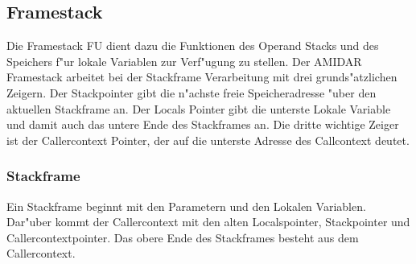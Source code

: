 \subsection{Framestack}

Die Framestack FU dient dazu die Funktionen des Operand Stacks und des Speichers f"ur lokale Variablen zur Verf"ugung zu stellen. 
Der AMIDAR Framestack arbeitet bei der Stackframe Verarbeitung mit drei grunds"atzlichen Zeigern. Der Stackpointer gibt die n"achste freie Speicheradresse "uber den aktuellen Stackframe an. Der Locals Pointer gibt die unterste Lokale Variable und damit auch das untere Ende des Stackframes an. Die dritte wichtige Zeiger ist der Callercontext Pointer, der auf die unterste Adresse des Callcontext deutet. 

\subsubsection{Stackframe}
Ein Stackframe beginnt mit den Parametern und den Lokalen Variablen.  Dar"uber kommt der Callercontext mit den alten Localspointer, Stackpointer und Callercontextpointer. Das obere Ende des Stackframes besteht aus dem Callercontext. 


